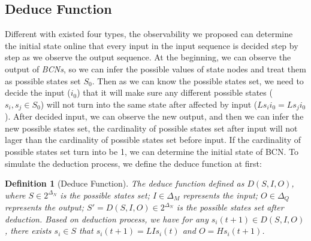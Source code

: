 \documentclass[conference]{IEEEtran} %
\newtheorem{definition}{Definition}
\begin{document}
\subsection{Deduce Function}
Different with existed four types, the observability we proposed can determine the initial state online that every input in the input sequence is decided step by step as we observe the output sequence. At the beginning, we can observe the output of {\em BCNs}, so we can infer the possible values of state nodes and treat them as possible states set $S_0$. Then as we can know the possible states set, we need to decide the input ($i_0$) that it will make sure any different possible states ($s_i, s_j \in S_0$) will not turn into the same state after affected by input ($Ls_i i_0=Ls_j i_0$). After decided input, we can observe the new output, and then we can infer the new possible states set, the cardinality of possible states set after input will not lager than the cardinality of possible states set before input. If the cardinality of possible states set turn into be 1, we can determine the initial state of BCN. To simulate the deduction process, we define the deduce function  at first:
\begin{definition}[Deduce Function] The deduce function defined as $D\left(S, I, O\right)$, where $S\in 2^{\Delta_N}$ is the possible states set; $I\in\Delta_M$ represents the input; $O\in\Delta_Q$ represents the output; $S'=D\left(S, I, O\right)\in 2^{\Delta_N}$ is the possible states set after deduction. Based on deduction process, we have for any $s_i(t+1)\in D\left(S, I, O\right)$, there exists $s_i\in S$ that $s_i(t+1)=LIs_i(t)$ and $O=Hs_i(t+1)$.
\end{definition}
\end{document}
